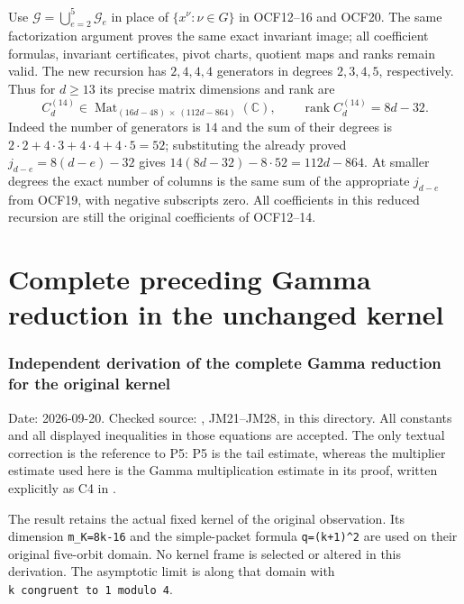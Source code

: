 Use $\mathcal G=\bigcup_{e=2}^5\mathcal G_e$ in place of
$\{x^\nu:\nu\in G\}$ in OCF12--16 and OCF20. The same
factorization argument proves the same exact invariant image;
all coefficient formulas, invariant certificates, pivot charts,
quotient maps and ranks remain valid. The new recursion has
$2,4,4,4$ generators in degrees $2,3,4,5$, respectively. Thus
for $d\geq13$ its precise matrix dimensions and rank are
\[
 C_d^{(14)}\in
 \operatorname{Mat}_{(16d-48)\,\times\,(112d-864)}(\mathbb C),
 \qquad \operatorname{rank}C_d^{(14)}=8d-32.
 \tag{OCF26}
\]
Indeed the number of generators is $14$ and the sum of their
degrees is $2\cdot2+4\cdot3+4\cdot4+4\cdot5=52$; substituting
the already proved $j_{d-e}=8(d-e)-32$ gives
$14(8d-32)-8\cdot52=112d-864$. At smaller degrees the exact
number of columns is the same sum of the appropriate $j_{d-e}$
from OCF19, with negative subscripts zero. All coefficients
in this reduced recursion are still the original coefficients
of OCF12--14.

\endgroup

\clearpage\begingroup
\part*{Complete preceding Gamma reduction in the unchanged kernel}
\providecommand{\mrkgtightlist}{\setlength{\itemsep}{0pt}\setlength{\parskip}{0pt}}

\section{Independent derivation of the complete Gamma reduction for the original kernel}\label{mrkg:independent-derivation-of-the-complete-gamma-reduction-for-the-original-kernel}

Date: 2026-09-20. Checked source: , JM21--JM28, in this directory. All constants and all displayed inequalities in those equations are accepted. The only textual correction is the reference to P5: P5 is the tail estimate, whereas the multiplier estimate used here is the Gamma multiplication estimate in its proof, written explicitly as C4 in .

The result retains the actual fixed kernel of the original observation. Its dimension \texttt{m\_K=8k-16} and the simple-packet formula \texttt{q=(k+1)\^{}2} are used on their original five-orbit domain. No kernel frame is selected or altered in this derivation. The asymptotic limit is along that domain with \texttt{k\ congruent\ to\ 1\ modulo\ 4}.

